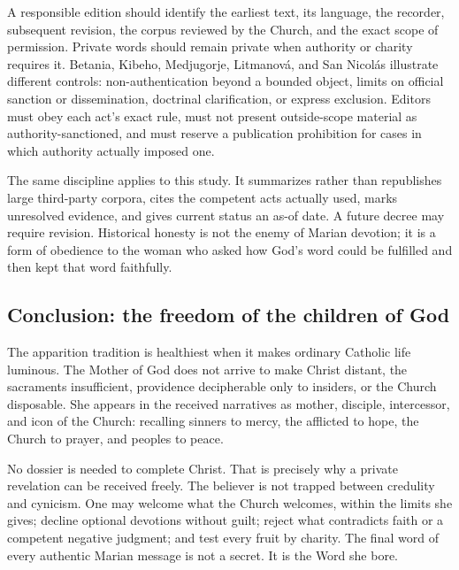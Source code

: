 A responsible edition should identify the earliest text, its language, the recorder, subsequent revision, the corpus reviewed by the Church, and the exact scope of permission. Private words should remain private when authority or charity requires it. Betania, Kibeho, Medjugorje, Litmanová, and San Nicolás illustrate different controls: non-authentication beyond a bounded object, limits on official sanction or dissemination, doctrinal clarification, or express exclusion. Editors must obey each act's exact rule, must not present outside-scope material as authority-sanctioned, and must reserve a publication prohibition for cases in which authority actually imposed one.

The same discipline applies to this study. It summarizes rather than republishes large third-party corpora, cites the competent acts actually used, marks unresolved evidence, and gives current status an as-of date. A future decree may require revision. Historical honesty is not the enemy of Marian devotion; it is a form of obedience to the woman who asked how God's word could be fulfilled and then kept that word faithfully.

\subsection{Conclusion: the freedom of the children of God}

The apparition tradition is healthiest when it makes ordinary Catholic life luminous. The Mother of God does not arrive to make Christ distant, the sacraments insufficient, providence decipherable only to insiders, or the Church disposable. She appears in the received narratives as mother, disciple, intercessor, and icon of the Church: recalling sinners to mercy, the afflicted to hope, the Church to prayer, and peoples to peace.

No dossier is needed to complete Christ. That is precisely why a private revelation can be received freely. The believer is not trapped between credulity and cynicism. One may welcome what the Church welcomes, within the limits she gives; decline optional devotions without guilt; reject what contradicts faith or a competent negative judgment; and test every fruit by charity. The final word of every authentic Marian message is not a secret. It is the Word she bore.

